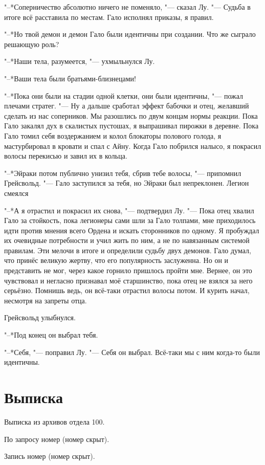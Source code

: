 \documentclass[a4paper,10pt]{book}
\newcommand{\ldotst}{\so{...}\xspace}
\begin{document}
"--*Соперничество абсолютно ничего не поменяло, "--- сказал Лу. "--- Судьба в итоге всё расставила по местам. Гало исполнял приказы, я правил.

"--*Но твой демон и демон Гало были идентичны при создании. Что же сыграло решающую роль?

"--*Наши тела, разумеется, "--- ухмыльнулся Лу.

"--*Ваши тела были братьями-близнецами!

"--*Пока они были на стадии одной клетки, они были идентичны, "--- пожал плечами стратег. "--- Ну а дальше сработал эффект бабочки и отец, желавший сделать из нас соперников. Мы разошлись по двум концам нормы реакции. Пока Гало закалял дух в скалистых пустошах, я выпрашивал пирожки в деревне. Пока Гало томил себя воздержанием и колол блокаторы полового голода, я мастурбировал в кровати и спал с Айну. Когда Гало побрился налысо, я покрасил волосы перекисью и завил их в кольца.

"--*Эйраки потом публично унизил тебя, сбрив тебе волосы, "--- припомнил Грейсвольд. "--- Гало заступился за тебя, но Эйраки был непреклонен. Легион смеялся\ldotst

"--*А я отрастил и покрасил их снова, "--- подтвердил Лу. "--- Пока отец хвалил Гало за стойкость, пока легионеры сами шли за Гало толпами, мне приходилось идти против мнения всего Ордена и искать сторонников по одному. Я пробуждал их очевидные потребности и учил жить по ним, а не по навязанным системой правилам. Эти мелочи в итоге и определили судьбу двух демонов. Гало думал, что принёс великую жертву, что его популярность заслуженна. Но он и представить не мог, через какое горнило пришлось пройти мне. Вернее, он это чувствовал и негласно признавал моё старшинство, пока отец не взялся за него серьёзно. Помнишь ведь, он всё-таки отрастил волосы потом. И курить начал, несмотря на запреты отца.

Грейсвольд улыбнулся.

"--*Под конец он выбрал тебя.

"--*Себя, "--- поправил Лу. "--- Себя он выбрал. Всё-таки мы с ним когда-то были идентичны.

\section{Выписка}

Выписка из архивов отдела 100.

По запросу номер (номер скрыт).

Запись номер (номер скрыт).
\end{document}
